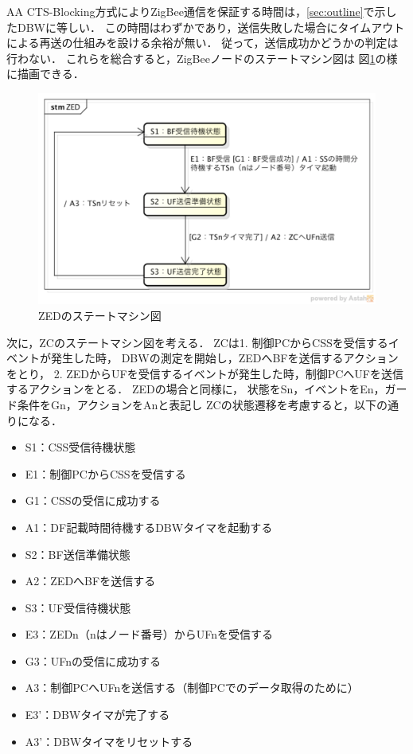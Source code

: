 \documentclass[12pt]{jreport}
\begin{document}
AA CTS-Blocking方式によりZigBee通信を保証する時間は，\ref{sec:outline}で示したDBWに等しい．
この時間はわずかであり，送信失敗した場合にタイムアウトによる再送の仕組みを設ける余裕が無い．
従って，送信成功かどうかの判定は行わない．
これらを総合すると，ZigBeeノードのステートマシン図は
図\ref{fig:zed_state}の様に描画できる． \\

\begin{figure}[bt]
 \centering
 \includegraphics[width=\columnwidth]{figure/zed_state.pdf}
 \caption{ZEDのステートマシン図}
 \label{fig:zed_state}
\end{figure}

次に，ZCのステートマシン図を考える．
ZCは1. 制御PCからCSSを受信するイベントが発生した時，
DBWの測定を開始し，ZEDへBFを送信するアクションをとり，
2. ZEDからUFを受信するイベントが発生した時，制御PCへUFを送信するアクションをとる．
ZEDの場合と同様に，
状態をSn，イベントをEn，ガード条件をGn，アクションをAnと表記し
ZCの状態遷移を考慮すると，以下の通りになる．

\begin{itemize}
 \item S1：CSS受信待機状態
 \item E1：制御PCからCSSを受信する
 \item G1：CSSの受信に成功する
 \item A1：DF記載時間待機するDBWタイマを起動する
 \item S2：BF送信準備状態
 \item A2：ZEDへBFを送信する
 \item S3：UF受信待機状態
 \item E3：ZEDn（nはノード番号）からUFnを受信する
 \item G3：UFnの受信に成功する
 \item A3：制御PCへUFnを送信する（制御PCでのデータ取得のために）
 \item E3'：DBWタイマが完了する
 \item A3'：DBWタイマをリセットする
\end{itemize}
\end{document}
